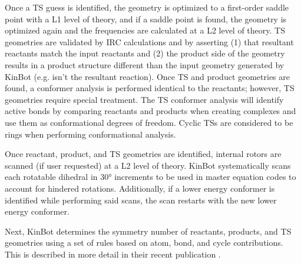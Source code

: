\documentclass[preprint, 11pt]{elsarticle} %
\begin{document}
Once a TS guess is identified, the geometry is optimized to a first-order saddle point with a L1 level of theory, and if a saddle point is found, the geometry is optimized again and the frequencies are calculated at a L2 level of theory.
TS geometries are validated by IRC calculations and by asserting (1) that resultant reactants match the input reactants and (2) the product side of the geometry results in a product structure different than the input geometry generated by KinBot (e.g.  isn't the resultant reaction).
Once TS and product geometries are found, a conformer analysis is performed identical to the reactants; however, TS geometries require special treatment. 
The TS conformer analysis will identify active bonds by comparing reactants and products when creating complexes and use them as conformational degrees of freedom.
Cyclic TSs are considered to be rings when performing conformational analysis.

Once reactant, product, and TS geometries are identified, internal rotors are scanned (if user requested) at a L2 level of theory.
KinBot systematically scans each rotatable dihedral in \ang{30} increments to be used in master equation codes to account for hindered rotations.
Additionally, if a lower energy conformer is identified while performing said scans, the scan restarts with the new lower energy conformer.


Next, KinBot determines the symmetry number of reactants, products, and TS geometries using a set of rules based on atom, bond, and cycle contributions.
This is described in more detail in their recent publication \cite{kinbot:2019}.
\end{document}
